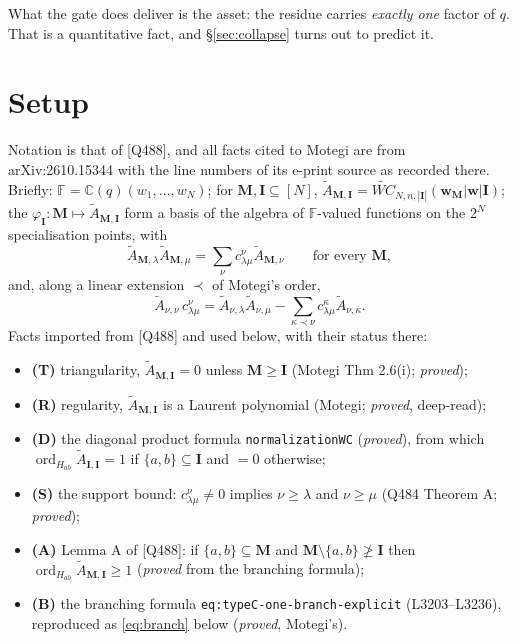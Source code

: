 \documentclass[11pt]{article}
\theoremstyle{plain}
\theoremstyle{definition}
\theoremstyle{remark}
\theoremstyle{plain}
\newcommand{\bI}{\mathbf{I}}
\newcommand{\bM}{\mathbf{M}}
\newcommand{\bw}{\mathbf{w}}
\newcommand{\At}{\widetilde{A}}
\newcommand{\ord}{\operatorname{ord}}
\begin{document}
What the gate does deliver is the asset: the residue carries \emph{exactly one}
factor of $q$.  That is a quantitative fact, and \S\ref{sec:collapse} turns out
to predict it.

\section{Setup}
\label{sec:setup}

Notation is that of [Q488], and all facts cited to Motegi are from arXiv:2610.15344 with the line
numbers of its e-print source as recorded there.  Briefly:
$\mathbb{F}=\mathbb{C}(q)(w_1,\dots,w_N)$; for $\bM,\bI\subseteq[N]$,
$\At_{\bM,\bI}=\widetilde{WC}_{N,n,|\bI|}(\bw_{\bM}|\bw|\bI)$; the
$\varphi_{\bI}:\bM\mapsto\At_{\bM,\bI}$ form a basis of the algebra of
$\mathbb{F}$-valued functions on the $2^N$ specialisation points, with
\begin{equation}
\At_{\bM,\lambda}\At_{\bM,\mu}=\sum_{\nu}c^{\nu}_{\lambda\mu}\At_{\bM,\nu}
\qquad\text{for every }\bM,
\label{eq:star}
\end{equation}
and, along a linear extension $\prec$ of Motegi's order,
\begin{equation}
\At_{\nu,\nu}\,c^{\nu}_{\lambda\mu}
=\At_{\nu,\lambda}\At_{\nu,\mu}
-\sum_{\kappa\prec\nu}c^{\kappa}_{\lambda\mu}\At_{\nu,\kappa}.
\label{eq:rec}
\end{equation}
Facts imported from [Q488] and used below, with their status there:
\begin{itemize}
\item \textbf{(T)} triangularity, $\At_{\bM,\bI}=0$ unless $\bM\ge\bI$
  (Motegi Thm 2.6(i); \emph{proved});
\item \textbf{(R)} regularity, $\At_{\bM,\bI}$ is a Laurent polynomial
  (Motegi; \emph{proved}, deep-read);
\item \textbf{(D)} the diagonal product formula \texttt{normalizationWC}
  (\emph{proved}), from which $\ord_{H_{ab}}\At_{\bI,\bI}=1$ if
  $\{a,b\}\subseteq\bI$ and $=0$ otherwise;
\item \textbf{(S)} the support bound: $c^{\nu}_{\lambda\mu}\ne0$ implies
  $\nu\ge\lambda$ and $\nu\ge\mu$ (Q484 Theorem A; \emph{proved});
\item \textbf{(A)} Lemma A of [Q488]: if $\{a,b\}\subseteq\bM$ and
  $\bM\setminus\{a,b\}\not\ge\bI$ then $\ord_{H_{ab}}\At_{\bM,\bI}\ge1$
  (\emph{proved} from the branching formula);
\item \textbf{(B)} the branching formula \texttt{eq:typeC-one-branch-explicit}
  (L3203--L3236), reproduced as \eqref{eq:branch} below (\emph{proved},
  Motegi's).
\end{itemize}
\end{document}
